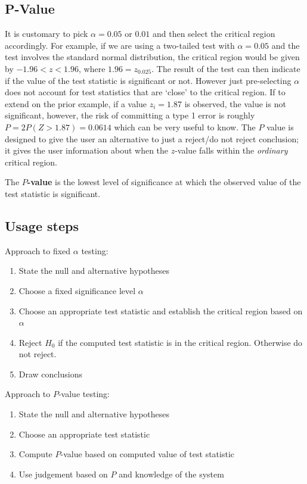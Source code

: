 \documentclass[10pt]{article}
\begin{document}
\subsection{P-Value}

It is customary to pick $ \alpha = 0.05 $  or $ 0.01 $ and then select the critical region accordingly.
For example, if we are using a two-tailed test with $ \alpha = 0.05 $ and the test involves the standard normal distribution, the critical region would be given by $ -1.96 < z < 1.96 $, where $ 1.96 = z_{0.025} $.
The result of the test can then indicate if the value of the test statistic is significant or not.
However just pre-selecting $ \alpha $ does not account for test statistics that are `close' to the critical region. 
If to extend on the prior example, if a value $ z_i = 1.87$ is observed, the value is not significant, however, the risk of committing a type 1 error is roughly $ P = 2P(Z > 1.87) = 0.0614 $ which can be very useful to know.
The $ P $ value is designed to give the user an alternative to just a reject/do not reject conclusion; it gives the user information about when the $ z $-value falls within the \textit{ordinary} critical region.

\begin{definition}
	The \textbf{$ P $-value} is the lowest level of significance at which the observed value of the test statistic is significant.
\end{definition}


\subsection{Usage steps}


Approach to fixed $ \alpha $ testing:
\begin{enumerate}
	\item State the null and alternative hypotheses
	\item Choose a fixed significance level $ \alpha $ 
	\item Choose an appropriate test statistic and establish the critical region based on $ \alpha $ 
	\item Reject $ H_0 $  if the computed test statistic is in the critical region. Otherwise do not reject.
	\item Draw conclusions
\end{enumerate}

Approach to $ P $-value testing:

\begin{enumerate}
	\item State the null and alternative hypotheses
	\item Choose an appropriate test statistic
	\item Compute $ P $-value based on computed value of test statistic
	\item Use judgement based on $ P $ and knowledge of the system
\end{enumerate}
\end{document}
